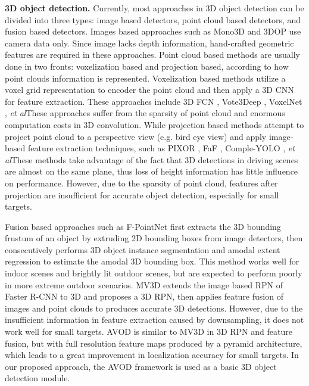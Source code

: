 \documentclass{bmvc2k}
\def\etal{\emph{et al}\bmvaOneDot}
\begin{document}
\textbf{3D object detection.} Currently, most approaches in 3D object detection can be divided into three types: image based detectors, point cloud based detectors, and fusion based detectors. Images based approaches such as Mono3D \cite{7780605} and 3DOP \cite{chen20183d} use camera data only. Since image lacks depth information, hand-crafted geometric features are required in these approaches. Point cloud based methods are usually done in two fronts: voxelization based and projection based, according to how point clouds information is represented. Voxelization based methods utilize a voxel grid representation to encoder the point cloud and then apply a 3D CNN for feature extraction. These approaches include 3D FCN \cite{li20173d}, Vote3Deep \cite{engelcke2017vote3deep}, VoxelNet \cite{zhou2018voxelnet}, \etal These approaches suffer from the sparsity of point cloud and enormous computation costs in 3D convolution. While projection based methods attempt to project point cloud to a perspective view (e.g. bird eye view) and apply image-based feature extraction techniques, such as PIXOR \cite{yang2018pixor}, FaF \cite{luo2018fast}, Comple-YOLO \cite{simon2018complex}, \etal These methods take advantage of the fact that 3D detections in driving scenes are almost on the same plane, thus loss of height information has little influence on performance. However, due to the sparsity of point cloud, features after projection are insufficient for accurate object detection, especially for small targets. 

Fusion based approaches such as F-PointNet \cite{qi2018frustum} first extracts the 3D bounding frustum of an object by extruding 2D bounding boxes from image detectors, then consecutively performs 3D object instance segmentation and amodal extent regression to estimate the amodal 3D bounding box. This method works well for indoor scenes and brightly lit outdoor scenes, but are expected to perform poorly in more extreme outdoor scenarios. MV3D \cite{chen2017multi} extends the image based RPN of Faster R-CNN\cite{ren2015faster} to 3D and proposes a 3D RPN, then applies feature fusion of images and point clouds to produces accurate 3D detections. However, due to the insufficient information in feature extraction caused by downsampling, it does not work well for small targets. AVOD \cite{ku2018joint} is similar to MV3D in 3D RPN and feature fusion, but with  full resolution feature maps produced by a pyramid architecture, which leads to a great improvement in localization accuracy for small targets. In our proposed approach, the AVOD framework is used as a basic 3D object detection module.
\end{document}

